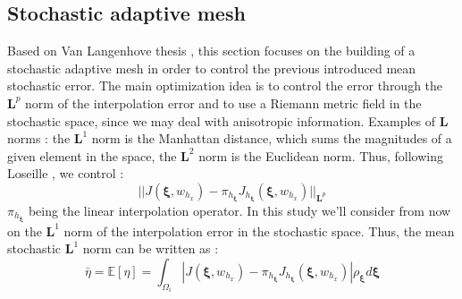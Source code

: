 \documentclass[11pt, a4paper, English]{report}
\begin{document}
\begin{appendix}
\section{Stochastic adaptive mesh}
Based on Van Langenhove thesis \cite{Janthesis}, this section focuses on the building of a stochastic adaptive mesh in order to control the previous introduced mean stochastic error. The main optimization idea is to control the error through the $\boldsymbol{L}^p$ norm of the interpolation error and to use a Riemann metric field in the stochastic space, since we may deal with anisotropic information. Examples of $\boldsymbol{L}$ norms : the $\boldsymbol{L}^1$ norm is the Manhattan distance, which sums the magnitudes of a given element in the space, the $\boldsymbol{L}^2$ norm is the Euclidean norm. Thus, following Loseille \cite{Loseille}, we control : %
$$||J(\boldsymbol{\xi},w_{h_x}) - \pi_{h_{\boldsymbol{\xi}} }    J_{h_{\boldsymbol{\xi}}}(\boldsymbol{\xi}, w_{h_x})||_{\boldsymbol{L}^p}       $$
$\pi_{h_{\boldsymbol{\xi}} }$ being the linear interpolation operator. In this study we'll consider from now on the $\boldsymbol{L}^1$ norm of the interpolation error in the stochastic space. Thus, the mean stochastic $\boldsymbol{L}^1$ norm can be written as :
$$ \bar{\eta} = \mathbb{E}[\eta] = \int_{\Omega_i} |J(\boldsymbol{\xi},w_{h_x}) - \pi_{h_{\boldsymbol{\xi}} }    J_{h_{\boldsymbol{\xi}}}(\boldsymbol{\xi}, w_{h_x})|\rho_{\boldsymbol{\xi}} d\boldsymbol{\xi} $$

\end{appendix}
\end{document}
